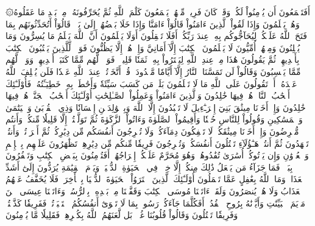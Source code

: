 ۞أَفَتَطۡمَعُونَ أَن يُؤۡمِنُواْ لَكُمۡ وَقَدۡ كَانَ فَرِيقٞ مِّنۡهُمۡ يَسۡمَعُونَ كَلَٰمَ ٱللَّهِ ثُمَّ يُحَرِّفُونَهُۥ مِنۢ بَعۡدِ مَا عَقَلُوهُ وَهُمۡ يَعۡلَمُونَ
وَإِذَا لَقُواْ ٱلَّذِينَ ءَامَنُواْ قَالُوٓاْ ءَامَنَّا وَإِذَا خَلَا بَعۡضُهُمۡ إِلَىٰ بَعۡضٖ قَالُوٓاْ أَتُحَدِّثُونَهُم بِمَا فَتَحَ ٱللَّهُ عَلَيۡكُمۡ لِيُحَآجُّوكُم بِهِۦ عِندَ رَبِّكُمۡۚ أَفَلَا تَعۡقِلُونَ
أَوَلَا يَعۡلَمُونَ أَنَّ ٱللَّهَ يَعۡلَمُ مَا يُسِرُّونَ وَمَا يُعۡلِنُونَ
وَمِنۡهُمۡ أُمِّيُّونَ لَا يَعۡلَمُونَ ٱلۡكِتَٰبَ إِلَّآ أَمَانِيَّ وَإِنۡ هُمۡ إِلَّا يَظُنُّونَ
فَوَيۡلٞ لِّلَّذِينَ يَكۡتُبُونَ ٱلۡكِتَٰبَ بِأَيۡدِيهِمۡ ثُمَّ يَقُولُونَ هَٰذَا مِنۡ عِندِ ٱللَّهِ لِيَشۡتَرُواْ بِهِۦ ثَمَنٗا قَلِيلٗاۖ فَوَيۡلٞ لَّهُم مِّمَّا كَتَبَتۡ أَيۡدِيهِمۡ وَوَيۡلٞ لَّهُم مِّمَّا يَكۡسِبُونَ
وَقَالُواْ لَن تَمَسَّنَا ٱلنَّارُ إِلَّآ أَيَّامٗا مَّعۡدُودَةٗۚ قُلۡ أَتَّخَذۡتُمۡ عِندَ ٱللَّهِ عَهۡدٗا فَلَن يُخۡلِفَ ٱللَّهُ عَهۡدَهُۥٓۖ أَمۡ تَقُولُونَ عَلَى ٱللَّهِ مَا لَا تَعۡلَمُونَ
بَلَىٰۚ مَن كَسَبَ سَيِّئَةٗ وَأَحَٰطَتۡ بِهِۦ خَطِيٓـَٔتُهُۥ فَأُوْلَـٰٓئِكَ أَصۡحَٰبُ ٱلنَّارِۖ هُمۡ فِيهَا خَٰلِدُونَ
وَٱلَّذِينَ ءَامَنُواْ وَعَمِلُواْ ٱلصَّـٰلِحَٰتِ أُوْلَـٰٓئِكَ أَصۡحَٰبُ ٱلۡجَنَّةِۖ هُمۡ فِيهَا خَٰلِدُونَ
وَإِذۡ أَخَذۡنَا مِيثَٰقَ بَنِيٓ إِسۡرَـٰٓءِيلَ لَا تَعۡبُدُونَ إِلَّا ٱللَّهَ وَبِٱلۡوَٰلِدَيۡنِ إِحۡسَانٗا وَذِي ٱلۡقُرۡبَىٰ وَٱلۡيَتَٰمَىٰ وَٱلۡمَسَٰكِينِ وَقُولُواْ لِلنَّاسِ حُسۡنٗا وَأَقِيمُواْ ٱلصَّلَوٰةَ وَءَاتُواْ ٱلزَّكَوٰةَ ثُمَّ تَوَلَّيۡتُمۡ إِلَّا قَلِيلٗا مِّنكُمۡ وَأَنتُم مُّعۡرِضُونَ
وَإِذۡ أَخَذۡنَا مِيثَٰقَكُمۡ لَا تَسۡفِكُونَ دِمَآءَكُمۡ وَلَا تُخۡرِجُونَ أَنفُسَكُم مِّن دِيَٰرِكُمۡ ثُمَّ أَقۡرَرۡتُمۡ وَأَنتُمۡ تَشۡهَدُونَ
ثُمَّ أَنتُمۡ هَـٰٓؤُلَآءِ تَقۡتُلُونَ أَنفُسَكُمۡ وَتُخۡرِجُونَ فَرِيقٗا مِّنكُم مِّن دِيَٰرِهِمۡ تَظَٰهَرُونَ عَلَيۡهِم بِٱلۡإِثۡمِ وَٱلۡعُدۡوَٰنِ وَإِن يَأۡتُوكُمۡ أُسَٰرَىٰ تُفَٰدُوهُمۡ وَهُوَ مُحَرَّمٌ عَلَيۡكُمۡ إِخۡرَاجُهُمۡۚ أَفَتُؤۡمِنُونَ بِبَعۡضِ ٱلۡكِتَٰبِ وَتَكۡفُرُونَ بِبَعۡضٖۚ فَمَا جَزَآءُ مَن يَفۡعَلُ ذَٰلِكَ مِنكُمۡ إِلَّا خِزۡيٞ فِي ٱلۡحَيَوٰةِ ٱلدُّنۡيَاۖ وَيَوۡمَ ٱلۡقِيَٰمَةِ يُرَدُّونَ إِلَىٰٓ أَشَدِّ ٱلۡعَذَابِۗ وَمَا ٱللَّهُ بِغَٰفِلٍ عَمَّا تَعۡمَلُونَ
أُوْلَـٰٓئِكَ ٱلَّذِينَ ٱشۡتَرَوُاْ ٱلۡحَيَوٰةَ ٱلدُّنۡيَا بِٱلۡأٓخِرَةِۖ فَلَا يُخَفَّفُ عَنۡهُمُ ٱلۡعَذَابُ وَلَا هُمۡ يُنصَرُونَ
وَلَقَدۡ ءَاتَيۡنَا مُوسَى ٱلۡكِتَٰبَ وَقَفَّيۡنَا مِنۢ بَعۡدِهِۦ بِٱلرُّسُلِۖ وَءَاتَيۡنَا عِيسَى ٱبۡنَ مَرۡيَمَ ٱلۡبَيِّنَٰتِ وَأَيَّدۡنَٰهُ بِرُوحِ ٱلۡقُدُسِۗ أَفَكُلَّمَا جَآءَكُمۡ رَسُولُۢ بِمَا لَا تَهۡوَىٰٓ أَنفُسُكُمُ ٱسۡتَكۡبَرۡتُمۡ فَفَرِيقٗا كَذَّبۡتُمۡ وَفَرِيقٗا تَقۡتُلُونَ
وَقَالُواْ قُلُوبُنَا غُلۡفُۢۚ بَل لَّعَنَهُمُ ٱللَّهُ بِكُفۡرِهِمۡ فَقَلِيلٗا مَّا يُؤۡمِنُونَ
